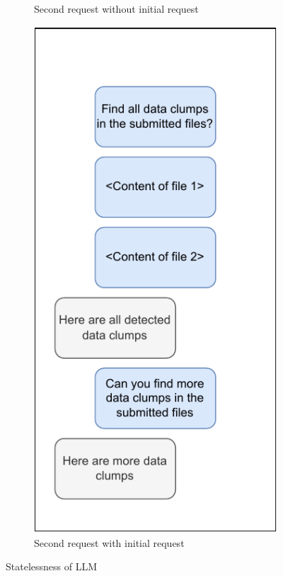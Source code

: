 \begin{figure}
\begin{adjustbox}{minipage=\linewidth,scale=0.7}
\begin{subfigure}[b]{0.30\textwidth}
         \caption{Second request without initial request}
         \label{fig:llm_stateless2}
     \end{subfigure}
     \hfill
     \begin{subfigure}[b]{0.3459\textwidth}
         \centering
         \includegraphics[width=\textwidth]{figures/chapter2/chatgpt_stateless_3.drawio.pdf}
 \caption{Second request with initial request}         \label{fig:llm_stateless3}
     \end{subfigure}
        \caption{Statelessness of \ac{LLM}}
        \label{fig:llm_stateless}
        \end{adjustbox}
\end{figure}

